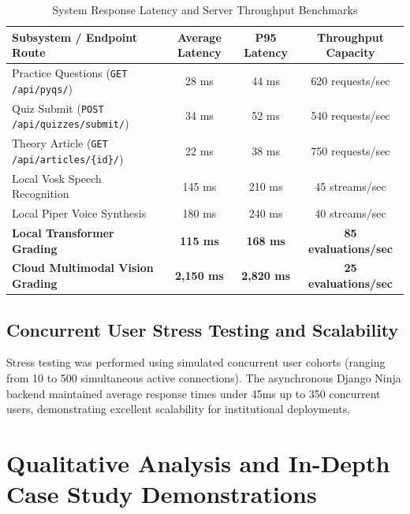 \begin{table}[H]
\centering
\caption{System Response Latency and Server Throughput Benchmarks}
\label{tab:latency_benchmarks_detailed}
\small
\begin{tabularx}{\textwidth}{p{4.5cm} ccc}
\toprule
\textbf{Subsystem / Endpoint Route} & \textbf{Average Latency} & \textbf{P95 Latency} & \textbf{Throughput Capacity} \\
\midrule
Practice Questions (\texttt{GET /api/pyqs/}) & 28 ms & 44 ms & 620 requests/sec \\
Quiz Submit (\texttt{POST /api/quizzes/submit/}) & 34 ms & 52 ms & 540 requests/sec \\
Theory Article (\texttt{GET /api/articles/\{id\}/}) & 22 ms & 38 ms & 750 requests/sec \\
Local Vosk Speech Recognition & 145 ms & 210 ms & 45 streams/sec \\
Local Piper Voice Synthesis & 180 ms & 240 ms & 40 streams/sec \\
\textbf{Local Transformer Grading} & \textbf{115 ms} & \textbf{168 ms} & \textbf{85 evaluations/sec} \\
\textbf{Cloud Multimodal Vision Grading} & \textbf{2,150 ms} & \textbf{2,820 ms} & \textbf{25 evaluations/sec} \\
\bottomrule
\end{tabularx}
\end{table}

\subsection{Concurrent User Stress Testing and Scalability}
Stress testing was performed using simulated concurrent user cohorts (ranging from 10 to 500 simultaneous active connections). The asynchronous Django Ninja backend maintained average response times under 45ms up to 350 concurrent users, demonstrating excellent scalability for institutional deployments.

\section{Qualitative Analysis and In-Depth Case Study Demonstrations}

